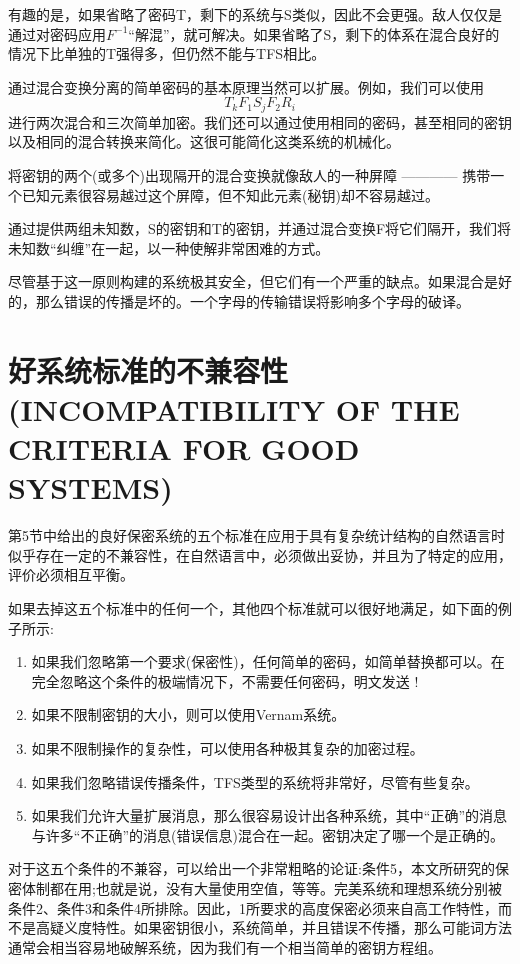 \documentclass[]{article}
\begin{document}
有趣的是，如果省略了密码T，剩下的系统与S类似，因此不会更强。敌人仅仅是通过对密码应用$F^{-1}$“解混”，就可解决。如果省略了S，剩下的体系在混合良好的情况下比单独的T强得多，但仍然不能与TFS相比。

通过混合变换分离的简单密码的基本原理当然可以扩展。例如，我们可以使用
\[T_kF_1S_jF_2R_i\]
进行两次混合和三次简单加密。我们还可以通过使用相同的密码，甚至相同的密钥以及相同的混合转换来简化。这很可能简化这类系统的机械化。

将密钥的两个(或多个)出现隔开的混合变换就像敌人的一种屏障 ———— 携带一个已知元素很容易越过这个屏障，但不知此元素(秘钥)却不容易越过。

通过提供两组未知数，S的密钥和T的密钥，并通过混合变换F将它们隔开，我们将未知数“纠缠”在一起，以一种使解非常困难的方式。

尽管基于这一原则构建的系统极其安全，但它们有一个严重的缺点。如果混合是好的，那么错误的传播是坏的。一个字母的传输错误将影响多个字母的破译。

\newpage
%   
%

\section{好系统标准的不兼容性(INCOMPATIBILITY OF THE CRITERIA FOR GOOD SYSTEMS)}

第5节中给出的良好保密系统的五个标准在应用于具有复杂统计结构的自然语言时似乎存在一定的不兼容性，在自然语言中，必须做出妥协，并且为了特定的应用，评价必须相互平衡。

如果去掉这五个标准中的任何一个，其他四个标准就可以很好地满足，如下面的例子所示:
\begin{enumerate}
	\item  如果我们忽略第一个要求(保密性)，任何简单的密码，如简单替换都可以。在完全忽略这个条件的极端情况下，不需要任何密码，明文发送 !
	\item 如果不限制密钥的大小，则可以使用Vernam系统。
	\item 如果不限制操作的复杂性，可以使用各种极其复杂的加密过程。
	\item 如果我们忽略错误传播条件，TFS类型的系统将非常好，尽管有些复杂。
	\item 如果我们允许大量扩展消息，那么很容易设计出各种系统，其中“正确”的消息与许多“不正确”的消息(错误信息)混合在一起。密钥决定了哪一个是正确的。
\end{enumerate}

对于这五个条件的不兼容，可以给出一个非常粗略的论证:条件5，本文所研究的保密体制都在用;也就是说，没有大量使用空值，等等。完美系统和理想系统分别被条件2、条件3和条件4所排除。因此，1所要求的高度保密必须来自高工作特性，而不是高疑义度特性。如果密钥很小，系统简单，并且错误不传播，那么可能词方法通常会相当容易地破解系统，因为我们有一个相当简单的密钥方程组。
\end{document}
